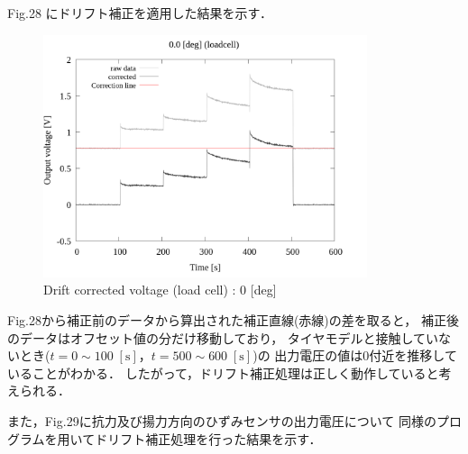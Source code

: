 Fig.28 にドリフト補正を適用した結果を示す．

\begin{figure}[htbp]
  \footnotesize
  \begin{center}
    \includegraphics[width=95mm]{../../02_workspace/result/2-1/plot/02-1_loadcell/02_loadcell-drift_0.png}
    \caption{Drift corrected voltage (load cell) : 0 [deg]}
  \end{center}
\end{figure}

Fig.28から補正前のデータから算出された補正直線(赤線)の差を取ると，
補正後のデータはオフセット値の分だけ移動しており，
タイヤモデルと接触していないとき($t = 0 \sim 100 \; [\mathrm{s}]$，$t = 500 \sim 600 \; [\mathrm{s}]$)の
出力電圧の値は0付近を推移していることがわかる．
したがって，ドリフト補正処理は正しく動作していると考えられる．

また，Fig.29に抗力及び揚力方向のひずみセンサの出力電圧について
同様のプログラムを用いてドリフト補正処理を行った結果を示す．

